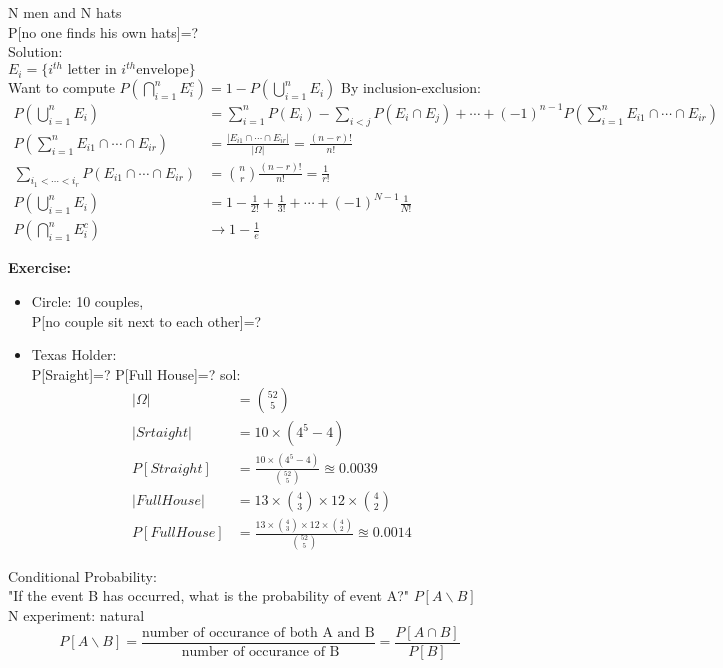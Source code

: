  \begin{example}[mismatch]{}
  N men and N hats\\
  P[no one finds his own hats]=?
    \\Solution:
   \\$ E_i=\{i^{th} \text{ letter in } i^{th} \text{envelope}\}$
   \\Want to compute $ P(\bigcap_{i=1}^{n}E_i^c)=1-P(\bigcup_{i=1}^{n}E_i) $
   By inclusion-exclusion:\begin{align*}{}{}
    P(\bigcup_{i=1}^{n}E_i)&=\sum_{i=1}^{n}P(E_i)-\sum_{i<j}P(E_i\cap E_j)+\cdots+(-1)^{n-1}P(\sum_{i=1}^{n}E_{i1}\cap\cdots\cap E_{ir})\\
    P(\sum_{i=1}^{n}E_{i1}\cap\cdots\cap E_{ir})&=\frac{|E_{i1}\cap\cdots\cap E_{ir}|}{|\Omega|}=\frac{(n-r)!}{n!}\\
    \sum_{i_1<\cdots<i_r}P(E_{i1}\cap\cdots\cap E_{ir})&=\binom{n}{r}\frac{(n-r)!}{n!}=\frac{1}{r!}\\
    P(\bigcup_{i=1}^{n}E_i)&=1-\frac{1}{2!}+\frac{1}{3!}+\cdots+(-1)^{N-1}\frac{1}{N!}\\
    P(\bigcap_{i=1}^{n}E_i^c)&\rightarrow1-\frac{1}{e}
   \end{align*}
 \end{example}
 \textbf{Exercise:}\begin{itemize}
 \item Circle: 10 couples, \\
 P[no couple sit next to each other]=?
 \item Texas Holder:\\
 P[Sraight]=?
 P[Full House]=?
 sol: \begin{align*}{}{}
 |\Omega|&=\binom{52}{5}  \\
    |Srtaight|&=10\times(4^5-4)  \\
    P[Straight]&=\frac{10\times(4^5-4)}{\binom{52}{5}}\approxeq 0.0039\\
    |Full House|&=13\times\binom{4}{3}\times 12\times\binom{4}{2}  \\
    P[Full House]&=\frac{13\times\binom{4}{3}\times 12\times\binom{4}{2}}{\binom{52}{5}}\approxeq 0.0014
 \end{align*} 
\end{itemize}
Conditional Probability:\\
"If the event B has occurred, what is the probability of event A?" $ P[A\backslash B] $ 
\\N experiment: natural $$
    P[A\backslash B]=\frac{\text{number of occurance of both A and B}}{\text{ number of occurance of B}}=\frac{P[A\cap B]}{P[B]}
$$ 
